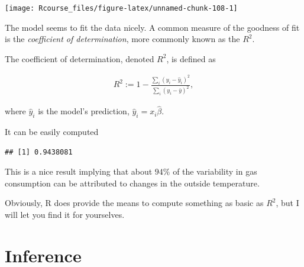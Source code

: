 \documentclass[]{book}
\newenvironment{Shaded}{\begin{snugshade}}{\end{snugshade}}
\newcommand{\KeywordTok}[1]{\textcolor[rgb]{0.13,0.29,0.53}{\textbf{#1}}}
\newcommand{\DataTypeTok}[1]{\textcolor[rgb]{0.13,0.29,0.53}{#1}}
\newcommand{\DecValTok}[1]{\textcolor[rgb]{0.00,0.00,0.81}{#1}}
\newcommand{\StringTok}[1]{\textcolor[rgb]{0.31,0.60,0.02}{#1}}
\newcommand{\ControlFlowTok}[1]{\textcolor[rgb]{0.13,0.29,0.53}{\textbf{#1}}}
\newcommand{\OperatorTok}[1]{\textcolor[rgb]{0.81,0.36,0.00}{\textbf{#1}}}
\newcommand{\NormalTok}[1]{#1}
\theoremstyle{definition}
\theoremstyle{definition}
\theoremstyle{definition}
\theoremstyle{remark}
\let\BeginKnitrBlock\begin \let\EndKnitrBlock\end
\begin{document}
\texttt{[image: Rcourse\_files/figure-latex/unnamed-chunk-108-1]}

The model seems to fit the data nicely. A common measure of the goodness
of fit is the \emph{coefficient of determination}, more commonly known
as the \(R^2\).



\BeginKnitrBlock{definition}[R2]
\protect\hypertarget{def:unnamed-chunk-109}{}{\label{def:unnamed-chunk-109}
{} }The coefficient of determination, denoted \(R^2\),
is defined as

\begin{align}
  R^2:= 1-\frac{\sum_i (y_i - \hat y_i)^2}{\sum_i (y_i - \bar y)^2},
\end{align}

where \(\hat y_i\) is the model's prediction,
\(\hat y_i = x_i \hat \beta\).
\EndKnitrBlock{definition}

It can be easily computed

\begin{Shaded}
\end{Shaded}

\begin{verbatim}
## [1] 0.9438081
\end{verbatim}

This is a nice result implying that about \(94\%\) of the variability in
gas consumption can be attributed to changes in the outside temperature.

Obviously, R does provide the means to compute something as basic as
\(R^2\), but I will let you find it for yourselves.

\section{Inference}\label{inference}
\end{document}
